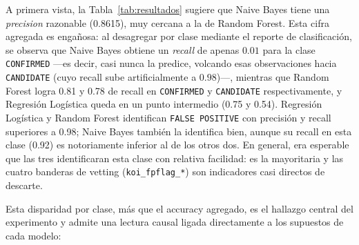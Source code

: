 \documentclass[10pt,journal]{IEEEtran}
\begin{document}
  A primera vista, la Tabla~\ref{tab:resultados} sugiere que Naive Bayes tiene una \emph{precision} razonable (0.8615), muy cercana a la de Random Forest. Esta cifra agregada es enga\~nosa: al desagregar por clase mediante el reporte de clasificaci\'on, se observa que Naive Bayes obtiene un \emph{recall} de apenas $0.01$ para la clase \texttt{CONFIRMED} —es decir, casi nunca la predice, volcando esas observaciones hacia \texttt{CANDIDATE} (cuyo recall sube artificialmente a $0.98$)—, mientras que Random Forest logra 0.81 y 0.78 de recall en \texttt{CONFIRMED} y \texttt{CANDIDATE} respectivamente, y Regresi\'on Log\'istica queda en un punto intermedio (0.75 y 0.54). Regresi\'on Log\'istica y Random Forest identifican \texttt{FALSE POSITIVE} con precisi\'on y recall superiores a 0.98; Naive Bayes tambi\'en la identifica bien, aunque su recall en esta clase (0.92) es notoriamente inferior al de los otros dos. En general, era esperable que las tres identificaran esta clase con relativa facilidad: es la mayoritaria y las cuatro banderas de vetting (\texttt{koi\_fpflag\_*}) son indicadores casi directos de descarte.

  Esta disparidad por clase, m\'as que el accuracy agregado, es el hallazgo central del experimento y admite una lectura causal ligada directamente a los supuestos de cada modelo:
\end{document}
